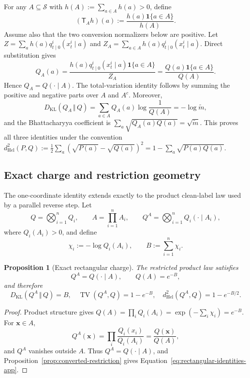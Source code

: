 \documentclass{article}
\newcommand{\KL}{D_{\mathrm{KL}}}
\newcommand{\kldiv}{\,\Vert\,}
\newcommand{\TV}{\operatorname{TV}}
\newcommand{\1}{\mathbf 1}
\newtheorem{proposition}[theorem]{Proposition}
\theoremstyle{definition}
\begin{document}
For any $A\subseteq\mathcal S$ with $h(A):=\sum_{a\in A}h(a)>0$, define
\[
 (\mathsf T_Ah)(a):=\frac{h(a)\1\{a\in A\}}{h(A)}.
\]
Assume also that the two conversion normalizers below are positive. Let
$Z=\sum_a h(a)q_{t\mid0}^i(x_t^i\mid a)$ and
$Z_A=\sum_{a\in A}h(a)q_{t\mid0}^i(x_t^i\mid a)$. Direct substitution gives
\begin{equation}
 Q_A(a)=\frac{h(a)q_{t\mid0}^i(x_t^i\mid a)\1\{a\in A\}}
 {Z_A}
 =\frac{Q(a)\1\{a\in A\}}{Q(A)}.
\end{equation}
Hence $Q_A=Q(\cdot\mid A)$. The total-variation identity follows by summing
the positive and negative parts over $A$ and $A^c$. Moreover,
\begin{equation}
 \KL(Q_A\kldiv Q)
 =\sum_{a\in A}Q_A(a)\log\frac{1}{Q(A)}=-\log\widetilde m,
\end{equation}
and the Bhattacharyya coefficient is
$\sum_a\sqrt{Q_A(a)Q(a)}=\sqrt{\widetilde m}$. This proves all three
identities under the convention
$d_{\mathrm{Hel}}^2(P,Q):=\frac12\sum_a(\sqrt{P(a)}-\sqrt{Q(a)})^2
=1-\sum_a\sqrt{P(a)Q(a)}$.

\subsection{Exact charge and restriction geometry}
\label{app:charge-geometry}

The one-coordinate identity extends exactly to the product clean-label law
used by a parallel reverse step. Let
\[
 Q=\bigotimes_{i=1}^n Q_i,
 \qquad
 A=\prod_{i=1}^n A_i,
 \qquad
 Q^A=\bigotimes_{i=1}^nQ_i(\cdot\mid A_i),
\]
where $Q_i(A_i)>0$, and define
\[
 \chi_i:=-\log Q_i(A_i),
 \qquad B:=\sum_{i=1}^n\chi_i.
\]

\begin{proposition}[Exact rectangular charge]
\label{prop:rectangular-charge}
The restricted product law satisfies
\begin{equation}
 Q^A=Q(\cdot\mid A),
 \qquad Q(A)=e^{-B},
 \label{eq:rectangular-mass-app}
\end{equation}
and therefore
\begin{equation}
 \KL(Q^A\kldiv Q)=B,
 \quad
 \TV(Q^A,Q)=1-e^{-B},
 \quad
 d_{\mathrm{Hel}}^2(Q^A,Q)=1-e^{-B/2}.
 \label{eq:rectangular-identities-app}
\end{equation}
\end{proposition}

\begin{proof}
Product structure gives
$Q(A)=\prod_iQ_i(A_i)=\exp(-\sum_i\chi_i)=e^{-B}$. For
$\bm x\in A$,
\[
 Q^A(\bm x)
 =\prod_i\frac{Q_i(x_i)}{Q_i(A_i)}
 =\frac{Q(\bm x)}{Q(A)},
\]
and $Q^A$ vanishes outside $A$. Thus $Q^A=Q(\cdot\mid A)$, and
Proposition~\ref{prop:converted-restriction} gives
Equation~\eqref{eq:rectangular-identities-app}.
\end{proof}
\end{document}
